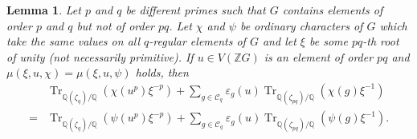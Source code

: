 \documentclass[11pt, a4paper]{amsart}
\newtheorem{lemma}[theorem]{Lemma}
\theoremstyle{definition}
\theoremstyle{definition}
\newcommand{\Tr}{\operatorname{Tr}}
\begin{document}
\begin{lemma}\label{lem:FirstLemmaApplications}
Let $p$ and $q$ be different primes such that $G$ contains elements of order $p$ and $q$ but not of order $pq$. Let $\chi$ and $\psi$ be ordinary characters of $G$ which take the same values on all $q$-regular elements of $G$ and let $\xi$ be some $pq$-th root of unity (not necessarily primitive). If $u \in V(\mathbb{Z}G)$ is an element of order $pq$ and $\mu(\xi, u, \chi) = \mu(\xi, u, \psi)$ holds, then
 \begin{equation}\label{eqn main luthar passi lemma}
    \begin{array}{cl}&\displaystyle
 \Tr_{\mathbb{Q}(\zeta_q)/\mathbb{Q}}(\chi(u^p)\xi^{-p}) + \sum_{g \in \mathcal{C}_q} \varepsilon_g(u)\Tr_{\mathbb{Q}(\zeta_{pq})/\mathbb{Q}}(\chi(g)\xi^{-1}) \\
 =& \displaystyle \Tr_{\mathbb{Q}(\zeta_q)/\mathbb{Q}}(\psi(u^p)\xi^{-p}) + \sum_{g \in \mathcal{C}_q} \varepsilon_g(u)\Tr_{\mathbb{Q}(\zeta_{pq})/\mathbb{Q}}(\psi(g)\xi^{-1}) . 
    \end{array}
 \end{equation}
\end{lemma}
\end{document}

